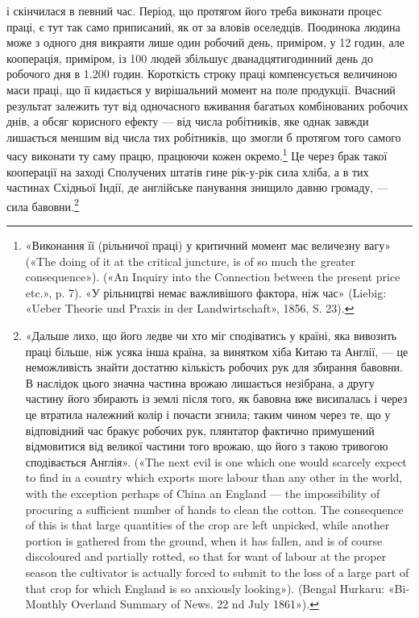 \parcont{}  %
і скінчилася в певний час. Період, що протягом його треба виконати
процес праці, є тут так само приписаний, як от за вловів
оселедців. Поодинока людина може з одного дня викраяти лише
один робочий день, приміром, у 12 годин, але кооперація, приміром,
із 100 людей збільшує дванадцятигодинний день до робочого
дня в 1.200 годин. Короткість строку праці компенсується
величиною маси праці, що її кидається у вирішальний момент
на поле продукції. Вчасний результат залежить тут від одночасного
вживання багатьох комбінованих робочих днів, а обсяг
корисного ефекту — від числа робітників, яке однак завжди
лишається меншим від числа тих робітників, що змогли б протягом
того самого часу виконати ту саму працю, працюючи кожен
окремо.\footnote{
«Виконання її (рільничої праці) у критичний момент має величезну
вагу» («The doing of it at the critical juncture, is of so much the
greater consequence»). («An Inquiry into the Connection between the present
price etc.», p. 7). «У рільництві немає важливішого фактора, ніж час»
(Liebig: «Ueber Theorie und Praxis in der Landwirtschaft», 1856, S. 23).
} Це через брак такої кооперації на заході Сполучених
штатів гине рік-у-рік сила хліба, а в тих частинах Східньої
Індії, де англійське панування знищило давню громаду, — сила
бавовни.\footnote{
«Дальше лихо, що його ледве чи хто міг сподіватись у країні,
яка вивозить праці більше, ніж усяка інша країна, за винятком хіба
Китаю та Англії, — це неможливість знайти достатню кількість робочих
рук для збирання бавовни. В наслідок цього значна частина врожаю лишається
незібрана, а другу частину його збирають із землі після того, як
бавовна вже висипалась і через це втратила належний колір і почасти
згнила; таким чином через те, що у відповідний час бракує робочих рук,
плянтатор фактично примушений відмовитися від великої частини того
врожаю, що його з такою тривогою сподівається Англія». («The next
evil is one which one would scarcely expect to find in a country which exports
more labour than any other in the world, with the exception perhaps of
China an England — the impossibility of procuring a sufficient number of
hands to clean the cotton. The consequence of this is that large quantities of
the crop are left unpicked, while another portion is gathered from the ground,
when it has fallen, and is of course discoloured and partially rotted, so
that for want of labour at the proper season the cultivator is actually forced
to submit to the loss of a large part of that crop for which England is so
anxiously looking»). (Bengal Hurkaru: «Bi-Monthly Overland Summary
of News. 22 nd July 1861»).
}

